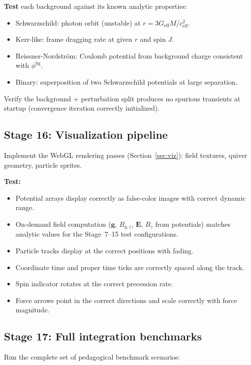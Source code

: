 \documentclass[11pt,a4paper]{article}
\newcommand{\vv}[1]{\mathbf{#1}}
\begin{document}
\textbf{Test} each background against its known analytic properties:
\begin{itemize}
  \item Schwarzschild: photon orbit (unstable) at $r = 3G_{\mathrm{eff}}M/c_{\mathrm{eff}}^2$.
  \item Kerr-like: frame dragging rate at given $r$ and spin $J$.
  \item Reissner-Nordström: Coulomb potential from background charge consistent with $\phi^{\mathrm{bg}}$.
  \item Binary: superposition of two Schwarzschild potentials at large separation.
\end{itemize}
Verify the background + perturbation split produces no spurious transients at startup (convergence iteration correctly initialized).

\subsection{Stage 16: Visualization pipeline}

Implement the WebGL rendering passes (Section~\ref{sec:viz}): field textures, quiver geometry, particle sprites.

\textbf{Test:}
\begin{itemize}
  \item Potential arrays display correctly as false-color images with correct dynamic range.
  \item On-demand field computation ($\vv{g}$, $B_{g,z}$, $\vv{E}$, $B_z$ from potentials) matches analytic values for the Stage~7--15 test configurations.
  \item Particle tracks display at the correct positions with fading.
  \item Coordinate time and proper time ticks are correctly spaced along the track.
  \item Spin indicator rotates at the correct precession rate.
  \item Force arrows point in the correct directions and scale correctly with force magnitude.
\end{itemize}

\subsection{Stage 17: Full integration benchmarks}

Run the complete set of pedagogical benchmark scenarios:
\end{document}
